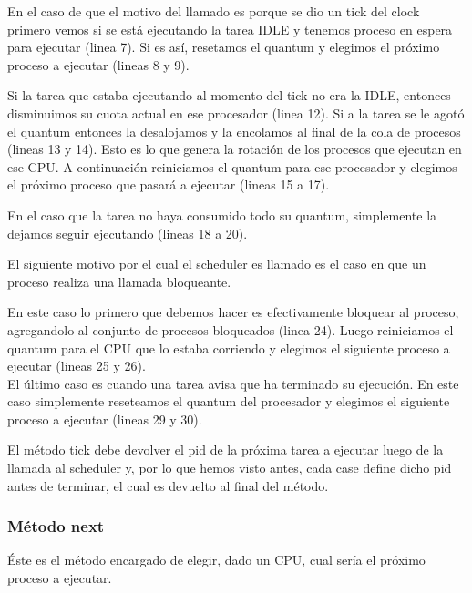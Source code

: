 \documentclass[a4paper,11pt]{article}
\begin{document}
			En el caso de que el motivo del llamado es porque se dio un tick del clock primero vemos si se está ejecutando la tarea IDLE y tenemos proceso en espera para ejecutar (linea 7). Si es así, resetamos el quantum y elegimos el próximo proceso a ejecutar (lineas 8 y 9).
		
			
			
			Si la tarea que estaba ejecutando al momento del tick no era la IDLE, entonces disminuimos su cuota actual en ese procesador (linea 12).
			Si a la tarea se le agotó el quantum entonces la desalojamos y la encolamos al final de la cola de procesos (lineas 13 y 14). Esto es lo que genera la rotación de los procesos que ejecutan en ese CPU. A continuación reiniciamos el quantum para ese procesador y elegimos el próximo proceso que pasará a ejecutar (lineas 15 a 17).
			
			En el caso que la tarea no haya consumido todo su quantum, simplemente la dejamos seguir ejecutando (lineas 18 a 20).	
			
			El siguiente motivo por el cual el scheduler es llamado es el caso en que un proceso realiza una llamada bloqueante.
		
			
		
			En este caso lo primero que debemos hacer es efectivamente bloquear al proceso, agregandolo al conjunto de procesos bloqueados (linea 24). Luego reiniciamos el quantum para el CPU que lo estaba corriendo y elegimos el siguiente proceso a ejecutar (lineas 25 y 26).
			\\
			
			El último caso es cuando una tarea avisa que ha terminado su ejecución. En este caso simplemente reseteamos el quantum del procesador y elegimos el siguiente proceso a ejecutar (lineas 29 y 30).
			
			
			
			El método tick debe devolver el pid de la próxima tarea a ejecutar luego de la llamada al scheduler y, por lo que hemos visto antes, cada case define dicho pid antes de terminar, el cual es devuelto al final del método.

		\subsubsection*{Método next}
			Éste es el método encargado de elegir, dado un CPU, cual sería el próximo proceso a ejecutar.
	
\end{document}
